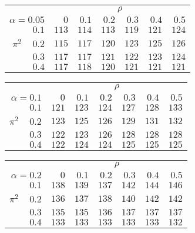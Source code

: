 \begin{tabular}{r|rrrrrr}
\hline\hline
 &\multicolumn{6}{c}{$\rho$} \\ 
 $\alpha = 0.05$ & $0$ & $0.1$ & $0.2$ & $0.3$ & $0.4$ & $0.5$ \\ 
 \hline$0.1$ & $113$ & $114$ & $113$ & $119$ & $121$ & $124$\\ 
$\pi^2\;\;\;$ $0.2$ & $115$ & $117$ & $120$ & $123$ & $125$ & $126$\\ 
$0.3$ & $117$ & $117$ & $121$ & $122$ & $123$ & $124$\\ 
$0.4$ & $117$ & $118$ & $120$ & $121$ & $121$ & $121$\\ 
 \hline 
 \end{tabular}
 
 \vspace{2em} 
 
\begin{tabular}{r|rrrrrr}
\hline\hline
 &\multicolumn{6}{c}{$\rho$} \\ 
 $\alpha = 0.1$ & $0$ & $0.1$ & $0.2$ & $0.3$ & $0.4$ & $0.5$ \\ 
 \hline$0.1$ & $121$ & $123$ & $124$ & $127$ & $128$ & $133$\\ 
$\pi^2\;\;\;$ $0.2$ & $123$ & $125$ & $126$ & $129$ & $131$ & $132$\\ 
$0.3$ & $122$ & $123$ & $126$ & $128$ & $128$ & $128$\\ 
$0.4$ & $122$ & $124$ & $124$ & $125$ & $125$ & $125$\\ 
 \hline 
 \end{tabular}
 
 \vspace{2em} 
 
\begin{tabular}{r|rrrrrr}
\hline\hline
 &\multicolumn{6}{c}{$\rho$} \\ 
 $\alpha = 0.2$ & $0$ & $0.1$ & $0.2$ & $0.3$ & $0.4$ & $0.5$ \\ 
 \hline$0.1$ & $138$ & $139$ & $137$ & $142$ & $144$ & $146$\\ 
$\pi^2\;\;\;$ $0.2$ & $136$ & $137$ & $138$ & $140$ & $142$ & $142$\\ 
$0.3$ & $135$ & $135$ & $136$ & $137$ & $137$ & $137$\\ 
$0.4$ & $133$ & $133$ & $133$ & $133$ & $133$ & $132$\\ 
 \hline 
 \end{tabular}